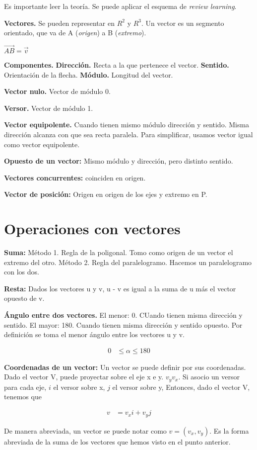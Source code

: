 \documentclass{article}
\begin{document}
Es importante leer la teoría. Se puede aplicar el esquema de
\textit{review learning}.

\textbf{Vectores.} Se pueden representar en $R^2$ y $R^3$. Un vector es un
segmento orientado, que va de A (\textit{origen}) a B (\textit{extremo}).

$\vec{AB} = \vec{v}$

\textbf{Componentes.}
\textbf{Dirección.} Recta a la que pertenece el vector.
\textbf{Sentido.} Orientación de la flecha.
\textbf{Módulo.} Longitud del vector.

\textbf{Vector nulo.} Vector de módulo 0.

\textbf{Versor.} Vector de módulo 1.

\textbf{Vector equipolente.} Cuando tienen mismo módulo dirección y sentido.
Misma dirección alcanza con que sea recta paralela. Para simplificar, usamos
vector igual como vector equipolente.

\textbf{Opuesto de un vector: } Mismo módulo y dirección, pero distinto sentido.

\textbf{Vectores concurrentes: } coinciden en origen.

\textbf{Vector de posición: } Origen en origen de los ejes y extremo en P.

\section*{Operaciones con vectores}

\textbf{Suma: } Método 1. Regla de la poligonal.
Tomo como origen de un vector el extremo del otro.
Método 2. Regla del paralelogramo. Hacemos un paralelogramo con los dos.

\textbf{Resta: } Dados los vectores u y v, u - v es igual a la suma de u más el
vector opuesto de v.

\textbf{Ángulo entre dos vectores. } El menor: 0. CUando tienen misma dirección
y sentido. El mayor: 180. Cuando tienen misma dirección y sentido opuesto.
Por definición se toma el menor ángulo entre los vectores u y v.

\begin{align*}
    0 & \leq \alpha \leq 180
\end{align*}

\textbf{Coordenadas de un vector: } Un vector se puede definir por sus
coordenadas. Dado el vector V, puede proyectar sobre el eje x e y. $v_y v_x$.
Si asocio un versor para cada eje, $i$ el versor sobre x, $j$ el versor sobre y,
Entonces, dado el vector V, tenemos que

\begin{align}
    v & = v_xi + v_yj
\end{align}

De manera abreviada, un vector se puede notar como $v=(v_x,v_y)$. Es la forma
abreviada de la suma de los vectores que hemos visto en el punto anterior.
\end{document}
